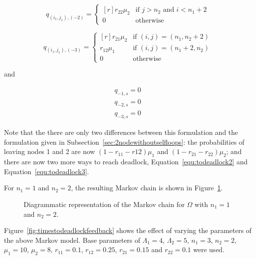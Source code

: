 \documentclass{article}
\begin{document}
\begin{equation}\label{equ:todeadlock3}
  q_{(i_1, j_1), (-2)} = \left\{
  \begin{matrix*}[ r ]
    r_{22}\mu_2 & \text{if } j > n_2 \text{ and } i < n_1 + 2 \\
    0 & \text{otherwise}
  \end{matrix*}
  \right.
\end{equation}

\begin{equation}
  q_{(i_1, j_1), (-3)} = \left\{
  \begin{matrix*}[ r ]
    r_{21}\mu_2 & \text{if } (i, j) = (n_1, n_2 + 2) \\
    r_{12}\mu_1 & \text{if } (i, j) = (n_1 + 2, n_2) \\
    0 & \text{otherwise}
  \end{matrix*}
  \right.
\end{equation}

and

\begin{align}
  q_{-1, s} = 0 \\
  q_{-2, s} = 0 \\
  q_{-3, s} = 0
\end{align}

Note that the there are only two differences between this formulation and the formulation given in Subsection~\ref{sec:2nodewithoutselfloops}: the probabilities of leaving nodes 1 and 2 are now $(1-r_{11}-r{12})\mu_1$ and $(1-r_{21}-r_{22})\mu_2$; and there are now two more ways to reach deadlock, Equation~\ref{equ:todeadlock2} and Equation~\ref{equ:todeadlock3}.

For $n_1 = 1$ and $n_2 = 2$, the resulting Markov chain is shown in Figure~\ref{fig:2nodeMCfeedback}.

\begin{figure}[!htbp]
    
    \caption{Diagrammatic representation of the Markov chain for $\Omega$ with $n_1=1$ and $n_2=2$.}
    \label{fig:2nodeMCfeedback}
\end{figure}

Figure~\ref{fig:timestodeadlockfeedback} shows the effect of varying the parameters of the above Markov model.
Base parameters of $\Lambda_1 = 4$, $\Lambda_2 = 5$, $n_1 = 3$, $n_2 = 2$, $\mu_1 = 10$, $\mu_2 = 8$, $r_{11} = 0.1$, $r_{12} = 0.25$, $r_{21} = 0.15$ and $r_{22} = 0.1$ were used.
\end{document}
